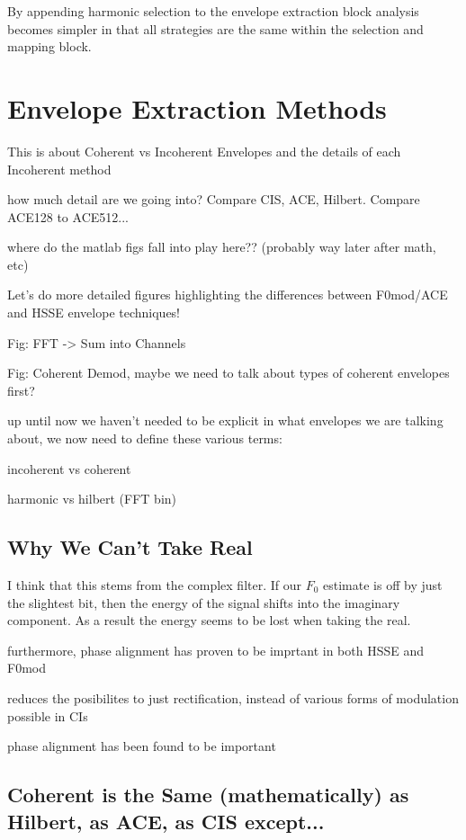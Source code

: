 \documentclass [11pt, proquest] {uwthesis}[2015/03/03]
\begin{document}
By appending harmonic selection to the envelope extraction block analysis becomes simpler in that all strategies are the same within the selection and mapping block.


\section{Envelope Extraction Methods}

This is about Coherent vs Incoherent Envelopes and the details of each Incoherent method

how much detail are we going into?  Compare CIS, ACE, Hilbert.  Compare ACE128 to ACE512...

where do the matlab figs fall into play here?? (probably way later after math, etc)

Let's do more detailed figures highlighting the differences between F0mod/ACE and HSSE envelope techniques!

Fig: FFT -> Sum into Channels

Fig: Coherent Demod, maybe we need to talk about types of coherent envelopes first?

up until now we haven't needed to be explicit in what envelopes we are talking about, we now need to define these various terms:

incoherent vs coherent

harmonic vs hilbert (FFT bin)


\subsection{Why We Can't Take Real}

I think that this stems from the complex filter.  If our $F_0$ estimate is off by just the slightest bit, then the energy of the signal shifts into the imaginary component.  As a result the energy seems to be lost when taking the real.

furthermore, phase alignment has proven to be imprtant in both HSSE and F0mod

reduces the posibilites to just rectification, instead of various forms of modulation possible in CIs

phase alignment has been found to be important


\subsection{Coherent is the Same (mathematically) as Hilbert, as ACE, as CIS except...}
\end{document}
